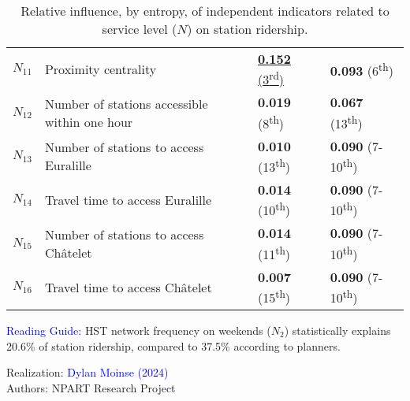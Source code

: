 \begin{table}[h!]
{\begin{tabular}{p{}p{}p{}p{}}
\small{\(N_{11}\)} & \small{Proximity centrality} & \underline{\small{\textbf{0.152}} (3\textsuperscript{rd})} & \small{\textbf{0.093} (6\textsuperscript{th})}\\
\small{\(N_{12}\)} & \small{Number of stations accessible within one hour} & \small{\textbf{0.019} (8\textsuperscript{th})} & \small{\textbf{0.067} (13\textsuperscript{th})}\\
\small{\(N_{13}\)} & \small{Number of stations to access Euralille} & \small{\textbf{0.010} (13\textsuperscript{th})} & \small{\textbf{0.090} (7-10\textsuperscript{th})}\\
\small{\(N_{14}\)} & \small{Travel time to access Euralille} & \small{\textbf{0.014} (10\textsuperscript{th})} & \small{\textbf{0.090} (7-10\textsuperscript{th})}\\
\small{\(N_{15}\)} & \small{Number of stations to access Châtelet} & \small{\textbf{0.014} (11\textsuperscript{th})} & \small{\textbf{0.090} (7-10\textsuperscript{th})}\\
\small{\(N_{16}\)} & \small{Travel time to access Châtelet} & \small{\textbf{0.007} (15\textsuperscript{th})} & \small{\textbf{0.090} (7-10\textsuperscript{th})}\\
        \hline
        \end{tabular}}
    \caption{Relative influence, by entropy, of independent indicators related to service level (\(N\)) on station ridership.}
    \label{table-chap6:influence-indicateurs-node}
        \vspace{5pt}
        \begin{flushleft}\scriptsize{
        \textcolor{blue}{Reading Guide:} \acrshort{HST} network frequency on weekends (\(N_{2}\)) statistically explains 20.6\% of station ridership, compared to 37.5\% according to planners.
        }\end{flushleft}
        \begin{flushright}\scriptsize{
        Realization: \textcolor{blue}{Dylan Moinse (2024)}
        \\
        Authors: \acrshort{NPART} Research Project
        }\end{flushright}
        \end{table}